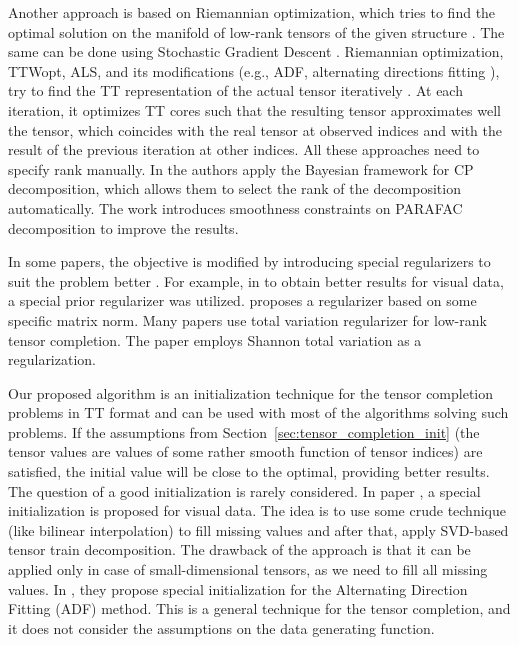Another approach is based on Riemannian optimization, which tries to find the optimal solution on the manifold of low-rank tensors of the given structure \citep{steinlechner2016riemannian}. The same can be done using Stochastic Gradient Descent \citep{yuan2017completion}. Riemannian optimization, TTWopt, ALS, and its modifications (e.g., ADF, alternating directions fitting \citep{grasedyck2013alternating}), try to find the TT representation of the actual tensor iteratively \citep{phien2016efficient,grasedyck2015variants}.
At each iteration, it optimizes TT cores such that the resulting tensor approximates well the tensor, which coincides with the real tensor at observed indices and with the result of the previous iteration at other indices. All these approaches need to specify rank manually.
In \citep{suzuki2015convergence,zhao2015bayesian} the authors apply the Bayesian framework for CP decomposition, which allows them to select the rank of the decomposition automatically.
The work \citep{yokota2016smooth} introduces smoothness constraints on PARAFAC decomposition to improve the results.

In some papers, the objective is modified by introducing special regularizers to suit the problem better \citep{yokota2016smooth}. For example, in \citep{chen2013simultaneous,zhao2015bayesian} to obtain better results for visual data, a special prior regularizer was utilized.
\citep{chen2017denoising} proposes a regularizer based on some specific matrix norm.
Many papers use total variation regularizer \citep{li2017low} for low-rank tensor completion.
The paper \cite{qin2020low} employs Shannon total variation as a regularization.

Our proposed algorithm is an initialization technique for the
tensor completion problems in TT format and can be used
with most of the algorithms solving such problems.
If the assumptions from Section~\ref{sec:tensor_completion_init} (the tensor values are values of some rather smooth function of tensor indices) are satisfied, the initial value will be close to the optimal,
providing better results.
The question of a good initialization is rarely considered.
In paper \citep{ko2018fast}, a special initialization is proposed for visual data. The idea is to use some crude technique (like bilinear interpolation) to fill missing values and after that, apply SVD-based tensor train decomposition.
The drawback of the approach is that it can be applied only in case of small-dimensional tensors, as we need to fill all missing values.
In \citep{grasedyck2013alternating}, they propose special initialization for the Alternating Direction Fitting (ADF) method.
This is a general technique for the tensor completion, and it does not consider the assumptions on the data generating function.

